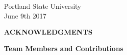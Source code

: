 \documentclass[11pt]{article}
\newcommand{\linespacing}{1.0}
\renewcommand{\baselinestretch}{\linespacing}
\begin{document}
\begin{center}
\large Portland State University	\\
\vskip3mm
June 9th 2017

\end{center}
\newpage


	


\newpage
\thispagestyle{empty}
\newpage
\setcounter{page}{1}
\null\vskip10mm
\begin{center}
\Large\textbf{ACKNOWLEDGMENTS}
\vskip10mm
\end{center}
\renewcommand{\baselinestretch}{\linespacing}
\small\normalsize



\thispagestyle{empty}
\newpage
\setcounter{page}{1}
\null\vskip10mm
\begin{center}
\Large\textbf{Team Members and Contributions}
\vskip10mm
\end{center}
\renewcommand{\baselinestretch}{1.0}
\small\normalsize
 

\newpage
\tableofcontents
\newpage
\newpage
\listoffigures
\newpage
\listoftables

\newpage
{}
\setlength{\parindent}{0ex}
\setlength{\parskip}{0.3em}


\end{document}
